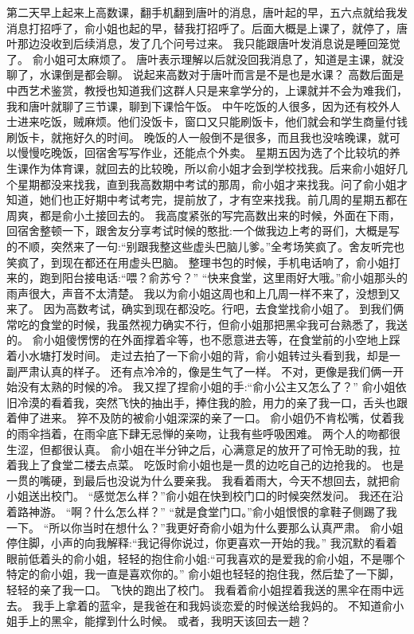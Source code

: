 第二天早上起来上高数课，翻手机翻到唐叶的消息，唐叶起的早，五六点就给我发消息打招呼了，俞小姐也起的早，替我打招呼了。后面大概是上课了，就停了，唐叶那边没收到后续消息，发了几个问号过来。
我只能跟唐叶发消息说是睡回笼觉了。
俞小姐可太麻烦了。
唐叶表示理解以后就没回我消息了，知道是主课，就没聊了，水课倒是都会聊。
说起来高数对于唐叶而言是不是也是水课？
高数后面是中西艺术鉴赏，教授也知道我们这群人只是来拿学分的，上课就并不会为难我们，我和唐叶就聊了三节课，聊到下课恰午饭。
中午吃饭的人很多，因为还有校外人士进来吃饭，贼麻烦。他们没饭卡，窗口又只能刷饭卡，他们就会和学生商量付钱刷饭卡，就拖好久的时间。
晚饭的人一般倒不是很多，而且我也没啥晚课，就可以慢慢吃晚饭，回宿舍写写作业，还能点个外卖。
星期五因为选了个比较坑的养生课作为体育课，就回去的比较晚，所以俞小姐才会到学校找我。后来俞小姐好几个星期都没来找我，直到我高数期中考试的那周，俞小姐才来找我。问了俞小姐才知道，她们也正好期中考试考完，提前放了，才有空来找我。前几周的星期五都在周爽，都是俞小土接回去的。
我高度紧张的写完高数出来的时候，外面在下雨，回宿舍整顿一下，跟舍友分享考试时候的憨批:一个做我边上考的哥们，大概是写的不顺，突然来了一句:“别跟我整这些虚头巴脑儿爹。”全考场笑疯了。舍友听完也笑疯了，到现在都还在用虚头巴脑。
整理书包的时候，手机电话响了，俞小姐打来的，跑到阳台接电话:“喂？俞苏兮？”
“快来食堂，这里雨好大哦。”俞小姐那头的雨声很大，声音不太清楚。
我以为俞小姐这周也和上几周一样不来了，没想到又来了。
因为高数考试，确实到现在都没吃。行吧，去食堂找俞小姐了。
到我们俩常吃的食堂的时候，我虽然视力确实不行，但俞小姐那把黑伞我可台熟悉了，我送的。
俞小姐傻愣愣的在外面撑着伞等，也不愿意进去等，在食堂前的小空地上踩着小水塘打发时间。
走过去拍了一下俞小姐的背，俞小姐转过头看到我，却是一副严肃认真的样子。
还有点冷冷的，像是生气了一样。
不对，更像是我们俩一开始没有太熟的时候的冷。
我又捏了捏俞小姐的手:“俞小公主又怎么了？”
俞小姐依旧冷漠的看着我，突然飞快的抽出手，捧住我的脸，用力的亲了我一口，舌头也跟着伸了进来。
猝不及防的被俞小姐深深的亲了一口。
俞小姐仍不肯松嘴，仗着我的雨伞挡着，在雨伞底下肆无忌惮的亲吻，让我有些呼吸困难。
两个人的吻都很生涩，但都很认真。
俞小姐在半分钟之后，心满意足的放开了可怜无助的我，拉着我上了食堂二楼去点菜。
吃饭时俞小姐也是一贯的边吃自己的边抢我的。
也是一贯的嘴硬，到最后也没说为什么要亲我。
我看着雨大，今天不想回去，就把俞小姐送出校门。
“感觉怎么样？”俞小姐在快到校门口的时候突然发问。
我还在沿着路神游。
“啊？什么怎么样？”
“就是食堂门口。”俞小姐恨恨的拿鞋子侧踢了我一下。
“所以你当时在想什么？”我更好奇俞小姐为什么要那么认真严肃。
俞小姐停住脚，小声的向我解释:“我记得你说过，你更喜欢一开始的我。”
我沉默的看着眼前低着头的俞小姐，轻轻的抱住俞小姐:“可我喜欢的是爱我的俞小姐，不是哪个特定的俞小姐，我一直是喜欢你的。”
俞小姐也轻轻的抱住我，然后垫了一下脚，轻轻的亲了我一口。
飞快的跑出了校门。
我看着俞小姐捏着我送的黑伞在雨中远去。
我手上拿着的蓝伞，是我爸在和我妈谈恋爱的时候送给我妈的。
不知道俞小姐手上的黑伞，能撑到什么时候。
或者，我明天该回去一趟？

